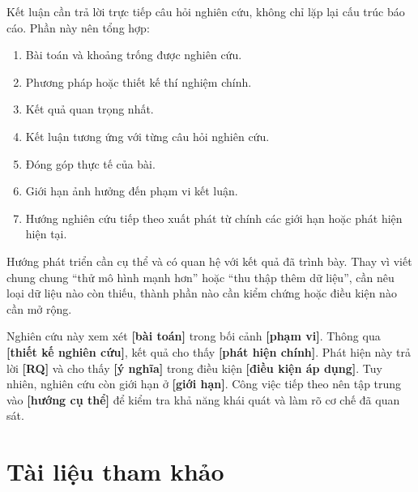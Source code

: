 \documentclass[12pt]{ai_conquer2026}
\begin{document}
Kết luận cần trả lời trực tiếp câu hỏi nghiên cứu, không chỉ lặp lại cấu trúc báo cáo. Phần này nên tổng hợp:

\begin{enumerate}
\item Bài toán và khoảng trống được nghiên cứu.
\item Phương pháp hoặc thiết kế thí nghiệm chính.
\item Kết quả quan trọng nhất.
\item Kết luận tương ứng với từng câu hỏi nghiên cứu.
\item Đóng góp thực tế của bài.
\item Giới hạn ảnh hưởng đến phạm vi kết luận.
\item Hướng nghiên cứu tiếp theo xuất phát từ chính các giới hạn hoặc phát hiện hiện tại.
\end{enumerate}

Hướng phát triển cần cụ thể và có quan hệ với kết quả đã trình bày. Thay vì viết chung chung ``thử mô hình mạnh hơn'' hoặc ``thu thập thêm dữ liệu'', cần nêu loại dữ liệu nào còn thiếu, thành phần nào cần kiểm chứng hoặc điều kiện nào cần mở rộng.

\begin{aivncodebox}
Nghiên cứu này xem xét \textbf{[bài toán]} trong bối cảnh \textbf{[phạm vi]}. Thông qua \textbf{[thiết kế nghiên cứu]}, kết quả cho thấy \textbf{[phát hiện chính]}. Phát hiện này trả lời \textbf{[RQ]} và cho thấy \textbf{[ý nghĩa]} trong điều kiện \textbf{[điều kiện áp dụng]}. Tuy nhiên, nghiên cứu còn giới hạn ở \textbf{[giới hạn]}. Công việc tiếp theo nên tập trung vào \textbf{[hướng cụ thể]} để kiểm tra khả năng khái quát và làm rõ cơ chế đã quan sát.
\end{aivncodebox}

\newpage
\section{Tài liệu tham khảo}
\label{section:references}
\vspace{-3.2em}
\printbibliography
\end{document}
